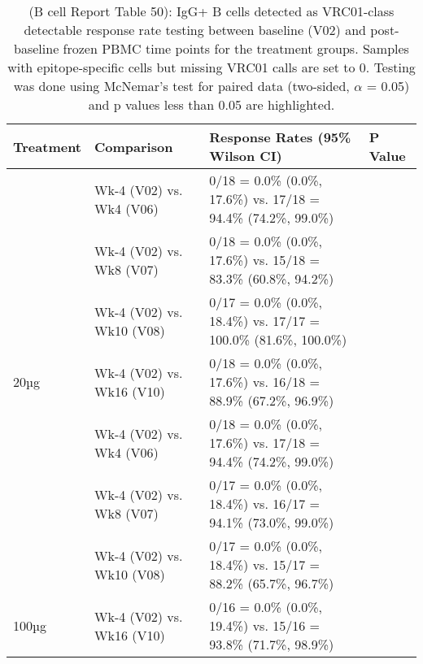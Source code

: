 \documentclass[
]{article}
\author{}
\date{\vspace{-2.5em}}
\begin{document}
\begin{table}[!h]

\caption[ (B cell Report Table 50): IgG+ B cells detected as VRC01-class detectable response rate testing between baseline (V02) and post-baseline frozen PBMC time points for the treatment groups (missing VRC01 calls set to 0)]{\label{tab:bcell-tab-50} (B cell Report Table 50): IgG+ B cells detected as VRC01-class detectable response rate testing between baseline (V02) and post-baseline frozen PBMC time points for the treatment groups. Samples with epitope-specific cells but missing VRC01 calls are set to 0. Testing was done using McNemar's test for paired data (two-sided, $\alpha$ = 0.05) and p values less than 0.05 are highlighted.}
\centering
\fontsize{8.5}{10.5}\selectfont
\begin{tabular}[t]{llll}
\toprule
Treatment & Comparison & Response Rates (95\% Wilson CI) & P Value\\
\midrule
 & Wk-4 (V02) vs. Wk4 (V06) & 0/18 = 0.0\% (0.0\%, 17.6\%) vs. 17/18 = 94.4\% (74.2\%, 99.0\%) & \cellcolor{yellow}{0.0001}\\
\cmidrule{2-4}
 & Wk-4 (V02) vs. Wk8 (V07) & 0/18 = 0.0\% (0.0\%, 17.6\%) vs. 15/18 = 83.3\% (60.8\%, 94.2\%) & \cellcolor{yellow}{0.0003}\\
\cmidrule{2-4}
 & Wk-4 (V02) vs. Wk10 (V08) & 0/17 = 0.0\% (0.0\%, 18.4\%) vs. 17/17 = 100.0\% (81.6\%, 100.0\%) & \cellcolor{yellow}{0.0001}\\
\cmidrule{2-4}
\multirow{-4}{*}{\raggedright\arraybackslash 20µg} & Wk-4 (V02) vs. Wk16 (V10) & 0/18 = 0.0\% (0.0\%, 17.6\%) vs. 16/18 = 88.9\% (67.2\%, 96.9\%) & \cellcolor{yellow}{0.0002}\\
\cmidrule{1-4}
 & Wk-4 (V02) vs. Wk4 (V06) & 0/18 = 0.0\% (0.0\%, 17.6\%) vs. 17/18 = 94.4\% (74.2\%, 99.0\%) & \cellcolor{yellow}{0.0001}\\
\cmidrule{2-4}
 & Wk-4 (V02) vs. Wk8 (V07) & 0/17 = 0.0\% (0.0\%, 18.4\%) vs. 16/17 = 94.1\% (73.0\%, 99.0\%) & \cellcolor{yellow}{0.0002}\\
\cmidrule{2-4}
 & Wk-4 (V02) vs. Wk10 (V08) & 0/17 = 0.0\% (0.0\%, 18.4\%) vs. 15/17 = 88.2\% (65.7\%, 96.7\%) & \cellcolor{yellow}{0.0003}\\
\cmidrule{2-4}
\multirow{-4}{*}{\raggedright\arraybackslash 100µg} & Wk-4 (V02) vs. Wk16 (V10) & 0/16 = 0.0\% (0.0\%, 19.4\%) vs. 15/16 = 93.8\% (71.7\%, 98.9\%) & \cellcolor{yellow}{0.0003}\\
\bottomrule
\end{tabular}
\end{table}
\end{document}
